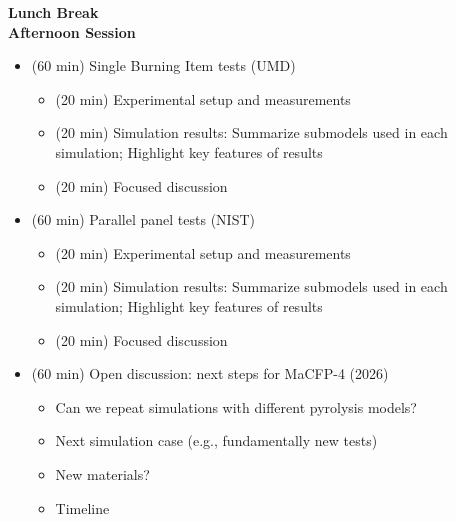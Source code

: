 \documentclass[12pt,demo]{article}
\begin{document}
\textbf{Lunch Break}\\		

\textbf{Afternoon Session}
\begin{itemize}[noitemsep]
\item (60 min) Single Burning Item tests (UMD)
\begin{itemize}[noitemsep]
\item (20 min) Experimental setup and measurements
\item (20 min) Simulation results: Summarize submodels used in each simulation; Highlight key features of results
\item (20 min) Focused discussion 
\end{itemize}
\item (60 min) Parallel panel tests (NIST)
\begin{itemize}[noitemsep]
\item (20 min) Experimental setup and measurements
\item (20 min) Simulation results: Summarize submodels used in each simulation; Highlight key features of results
\item (20 min) Focused discussion 
\end{itemize}
\item (60 min) Open discussion: next steps for MaCFP-4 (2026)
\begin{itemize}[noitemsep]
\item Can we repeat simulations with different pyrolysis models?
\item Next simulation case (e.g., fundamentally new tests)
\item New materials?
\item Timeline
\end{itemize}
\end{itemize}
\end{document}
